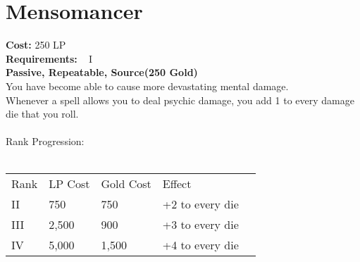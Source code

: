 \section{Mensomancer}\label{perk:mensomancer}
\textbf{Cost:} 250 LP\\
\textbf{Requirements:} ~ I\\
\textbf{Passive, Repeatable, Source(250 Gold)}\\
You have become able to cause more devastating mental damage.\\
Whenever a spell allows you to deal psychic damage, you add 1 to every damage die that you roll.\\
\\
Rank Progression:\\
\\
\begin{tabular}{l | l | l | l | l}
    Rank & LP Cost & Gold Cost &  Effect\\
    II & 750 & 750 & +2 to every die\\
    III & 2,500 & 900 & +3 to every die\\
    IV & 5,000 & 1,500 & +4 to every die\\
\end{tabular}